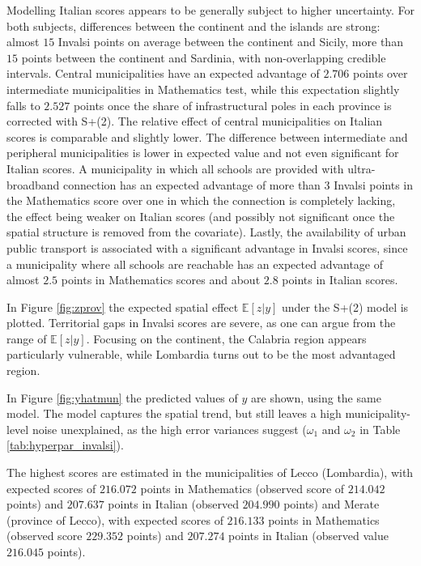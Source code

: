 \documentclass[openany, 11pt, oneside]{book}
\begin{document}
Modelling Italian scores appears to be generally subject to higher uncertainty. For both subjects, differences between the continent and the islands are strong: almost $15$ Invalsi points on average between the continent and Sicily, more than $15$ points between the continent and Sardinia, with non-overlapping credible intervals. Central municipalities have an expected advantage of $2.706$ points over intermediate municipalities in Mathematics test, while this expectation slightly falls to $2.527$ points once the share of infrastructural poles in each province is corrected with S+(2). The relative effect of central municipalities on Italian scores is comparable and slightly lower. The difference between intermediate and peripheral municipalities is lower in expected value and not even significant for Italian scores. A municipality in which all schools are provided with ultra-broadband connection has an expected advantage of more than $3$ Invalsi points in the Mathematics score over one in which the connection is completely lacking, the effect being weaker on Italian scores (and possibly not significant once the spatial structure is removed from the covariate). Lastly, the availability of urban public transport is associated with a significant advantage in Invalsi scores, since a municipality where all schools are reachable has an expected advantage of almost $2.5$ points in Mathematics scores and about $2.8$ points in Italian scores. 

In Figure \ref {fig:zprov} the expected spatial effect $\mathbb{E}[z|y]$ under the S+(2) model is plotted. %
Territorial gaps in Invalsi scores are severe, as one can argue from the range of $\mathbb{E}[z\vert y]$. Focusing on the continent, the Calabria region appears particularly vulnerable, while Lombardia turns out to be the most advantaged region. 

In Figure \ref{fig:yhatmun} the predicted values of $y$ are shown, using the same model. The model captures the spatial trend, but still leaves a high municipality-level noise unexplained, as the high error variances suggest ($\omega_1$ and $\omega_2$ in Table \ref{tab:hyperpar_invalsi}). 

The highest scores are estimated in the municipalities of Lecco (Lombardia), with expected scores of $216.072$ points in Mathematics (observed score of $214.042$ points) and $207.637$ points in Italian (observed $204.990$ points) and Merate (province of Lecco), with expected scores of $216.133$ points in Mathematics (observed score $229.352$ points) and $207.274$ points in Italian (observed value $216.045$ points). 
\end{document}
